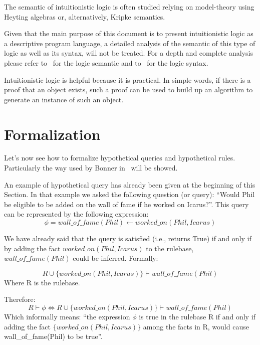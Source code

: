 The semantic of intuitionistic logic is often studied relying on model-theory
using Heyting algebras or, alternatively, Kripke semantics.

Given that the main purpose of this document is to present
intuitionistic logic as a descriptive program language, a detailed analysis of the semantic
of this type of logic  as well as its syntax, will not be treated. For a depth and complete analysis please refer
to~\cite{Kripke1963-KRISAO-2} for the logic semantic and to~\cite{Dirk} for the logic syntax.

Intuitionistic logic is helpful because it is practical. In simple words, if there is
a proof that an object exists, such a proof can be used to build up an algorithm to
generate an instance of such an object.


\section{Formalization}
\label{sec:formalization}
Let's now see how to formalize hypothetical queries and hypothetical rules.
Particularly the way used by Bonner in~\cite{Bonner88alogic} will be showed.

An example of hypothetical query has already been given at the beginning of this Section.
In that example we asked the following question (or query): ``Would Phil be eligible to
be added on the wall of fame if he worked on Icarus?''. This query
can be represented by the following expression:
\begin{equation}
  \phi = wall\_of\_fame(Phil) \leftarrow worked\_on(Phil, Icarus)
\end{equation}

We have already said that the query is satisfied (i.e., returns True) if and only if by
adding the fact $worked\_on(Phil, Icarus)$ to the rulebase,  $wall\_of\_fame(Phil)$ could
be inferred. Formally:

\begin{equation}
  R \cup \{worked\_on(Phil, Icarus)\} \vdash wall\_of\_fame(Phil)
\end{equation}
Where R is the rulebase.

Therefore:
\begin{equation}
  R \vdash \phi \iff R \cup \{worked\_on(Phil, Icarus)\} \vdash wall\_of\_fame(Phil)
\end{equation}
Which informally means: ``the expression $\phi$ is true in the rulebase R if and only if
adding the fact $\{worked\_on(Phil, Icarus)\}$ among the facts in R, would cause wall\_of\_fame(Phil)
to be true''.


